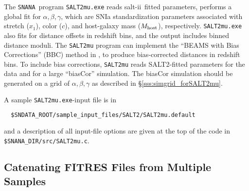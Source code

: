 \documentclass[12pt]{article}
\newcommand{\SALTII}{{\sc salt-ii}}
\newcommand{\snana}{{\tt SNANA}}
\newcommand{\hostmass}{M_{\rm host}}
\begin{document}
The \snana\ program {\tt SALT2mu.exe} reads \SALTII\ fitted parameters,
performs a global fit for $\alpha,\beta,\gamma$, which are SNIa 
standardization parameters associated with 
stretch ($x_1$), color ($c$), and host-galaxy mass ($\hostmass$),
respectively.
{\tt SALT2mu.exe} also fits for distance offsets in redshift bins,
and the output includes binned distance moduli.
The {\tt SALT2mu} program can implement the 
``BEAMS with Bias Corrections'' (BBC) method in \cite{JM11,BBC},
to produce bias-corrected distances in redshift bins.
To include bias corrections, {\tt SALT2mu} reads SALT2-fitted 
parameters for the data and for a large ``biasCor'' simulation.
The biasCor simulation should be generated on a grid of
$\alpha,\beta,\gamma$ as described in \S\ref{sss:simgrid_forSALT2mu}.

A sample {\tt SALT2mu.exe}-input file is in
\begin{verbatim}
  $SNDATA_ROOT/sample_input_files/SALT2/SALT2mu.default
\end{verbatim}
and a description of all input-file options are given at the
top of the code in {\tt \$SNANA\_DIR/src/SALT2mu.c}.


  \clearpage
  \subsection{Catenating FITRES Files from Multiple Samples}
  \label{subsec:cat_fitres}
\end{document}

